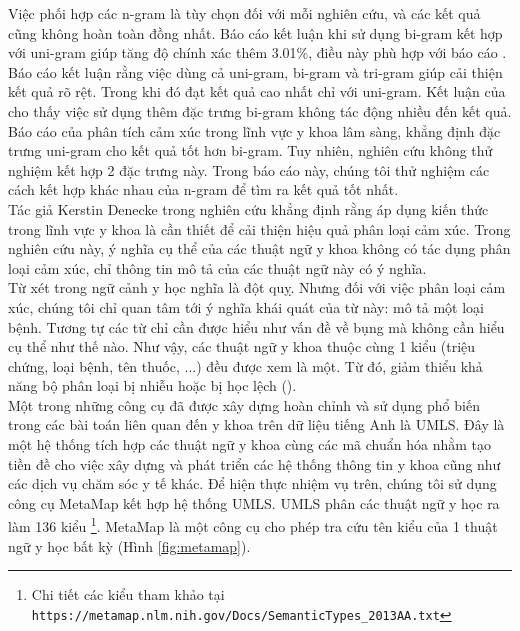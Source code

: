 Việc phối hợp các n-gram là tùy chọn đối với mỗi nghiên cứu, và các kết quả cũng không hoàn toàn đồng nhất. Báo cáo \cite{niu2005analysis} kết luận khi sử dụng bi-gram kết hợp với uni-gram giúp tăng độ chính xác thêm 3.01\%, điều này phù hợp với báo cáo \cite{sarker2011outcome}. Báo cáo \cite{sarker2011outcome} kết luận rằng việc dùng cả uni-gram, bi-gram và tri-gram giúp cải thiện kết quả rõ rệt. Trong khi đó \cite{pang2002thumbs} đạt kết quả cao nhất chỉ với uni-gram. Kết luận của \cite{pang2002thumbs} cho thấy việc sử dụng thêm đặc trưng bi-gram không tác động nhiều đến kết quả. Báo cáo của \cite{smith2012cross} phân tích cảm xúc trong lĩnh vực y khoa lâm sàng, khẳng định đặc trưng uni-gram cho kết quả tốt hơn bi-gram. Tuy nhiên, nghiên cứu không thử nghiệm kết hợp 2 đặc trưng này. Trong báo cáo này, chúng tôi thử nghiệm các cách kết hợp khác nhau của n-gram để tìm ra kết quả tốt nhất.\\

Tác giả Kerstin Denecke trong nghiên cứu \cite{denecke2015sentiment} khẳng định rằng áp dụng kiến thức trong lĩnh vực y khoa là cần thiết để cải thiện hiệu quả phân loại cảm xúc. Trong nghiên cứu này, ý nghĩa cụ thể của các thuật ngữ y khoa không có tác dụng phân loại cảm xúc, chỉ thông tin mô tả của các thuật ngữ này có ý nghĩa.\\

Từ  xét trong ngữ cảnh y học nghĩa là đột quỵ. Nhưng đối với việc phân loại cảm xúc, chúng tôi chỉ quan tâm tới ý nghĩa khái quát của từ này:  mô tả một loại bệnh. Tương tự các từ  chỉ cần được hiểu như vấn đề về bụng mà không cần hiểu cụ thể như thế nào. Như vậy, các thuật ngữ y khoa thuộc cùng 1 kiểu (triệu chứng, loại bệnh, tên thuốc, ...) đều được xem là một. Từ đó, giảm thiểu khả năng bộ phân loại bị nhiễu hoặc bị học lệch ().\\

Một trong những công cụ đã được xây dựng hoàn chỉnh và sử dụng phổ biến trong các bài toán liên quan đến y khoa trên dữ liệu tiếng Anh là UMLS. Đây là một hệ thống tích hợp các thuật ngữ y khoa cùng các mã chuẩn hóa nhằm tạo tiền đề cho việc xây dựng và phát triển các hệ thống thông tin y khoa cũng như các dịch vụ chăm sóc y tế khác. Để hiện thực nhiệm vụ trên, chúng tôi sử dụng công cụ MetaMap kết hợp hệ thống UMLS. UMLS phân các thuật ngữ y học ra làm 136 kiểu \footnote{Chi tiết các kiểu tham khảo tại \texttt{https://metamap.nlm.nih.gov/Docs/SemanticTypes\_2013AA.txt}}. MetaMap là một công cụ cho phép tra cứu tên kiểu của 1 thuật ngữ y học bất kỳ (Hình \ref{fig:metamap}).\\

